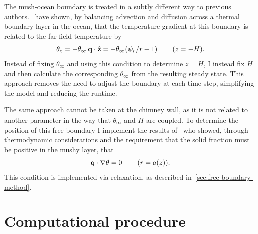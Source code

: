 \documentclass[11pt]{proc}
\begin{document}
The mush-ocean boundary is treated in a subtly different way to previous authors.~\citet*{schulze-worster-98} have shown, by balancing advection and diffusion across a thermal boundary layer in the ocean, that the temperature gradient at this boundary is related to the far field temperature by
\begin{equation}
\label{eq:mush-ocean-bc}
\theta_z = - \theta_\infty \, \mathbf{q} \cdot \mathbf{\hat{z}} = - \theta_\infty (\psi_r/r + 1) \hspace{5ex} (z=-H).
\end{equation}
Instead of fixing $\theta_\infty$ and using this condition to determine $z=H$, I instead fix $H$ and then calculate the corresponding $\theta_\infty$ from the resulting steady state. This approach removes the need to adjust the boundary at each time step, simplifying the model and reducing the runtime.

The same approach cannot be taken at the chimney wall, as it is not related to another parameter in the way that $\theta_\infty$ and $H$ are coupled. To determine the position of this free boundary I implement the results of~\citet*{schulze-worster-99} who showed, through thermodynamic considerations and the requirement that the solid fraction must be positive in the mushy layer, that  
\begin{equation}
\label{eq:chimney-bc}
\mathbf{q} \cdot \nabla \theta = 0 \hspace{5ex} ( r=a(z) ).
\end{equation}
This condition is implemented via relaxation, as described in~\autoref{sec:free-boundary-method}.

\section{Computational procedure}
\label{sec:computational-procedure}
\end{document}
